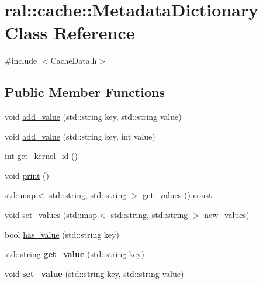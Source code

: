 \hypertarget{classral_1_1cache_1_1MetadataDictionary}{}\section{ral\+:\+:cache\+:\+:Metadata\+Dictionary Class Reference}
\label{classral_1_1cache_1_1MetadataDictionary}


{\ttfamily \#include $<$Cache\+Data.\+h$>$}

\subsection*{Public Member Functions}
\begin{DoxyCompactItemize}
\item 
void \hyperlink{classral_1_1cache_1_1MetadataDictionary_a99828bf2a71b8e06d568420e5c2b460d}{add\+\_\+value} (std\+::string key, std\+::string value)
\item 
void \hyperlink{classral_1_1cache_1_1MetadataDictionary_a5f2f0c2542ea15ca00d273df68041551}{add\+\_\+value} (std\+::string key, int value)
\item 
int \hyperlink{classral_1_1cache_1_1MetadataDictionary_a03066b3e050bf5f504613aab7604d768}{get\+\_\+kernel\+\_\+id} ()
\item 
void \hyperlink{classral_1_1cache_1_1MetadataDictionary_a762943ae80571c2f5ea6dfbcea07a3bb}{print} ()
\item 
std\+::map$<$ std\+::string, std\+::string $>$ \hyperlink{classral_1_1cache_1_1MetadataDictionary_abdc2863d96dc839565f2078471f4c9f7}{get\+\_\+values} () const
\item 
void \hyperlink{classral_1_1cache_1_1MetadataDictionary_a99d66a4b93ebb5f187da5c8968054a54}{set\+\_\+values} (std\+::map$<$ std\+::string, std\+::string $>$ new\+\_\+values)
\item 
bool \hyperlink{classral_1_1cache_1_1MetadataDictionary_a72ac4462583a2be4be3de19eb230b624}{has\+\_\+value} (std\+::string key)
\item 
\mbox{\label{classral_1_1cache_1_1MetadataDictionary_a50be7e17be586f17dd10228227a51a15}} 
std\+::string {\bfseries get\+\_\+value} (std\+::string key)
\item 
\mbox{\label{classral_1_1cache_1_1MetadataDictionary_afd9178b77c468cc390786830aba8b968}} 
void {\bfseries set\+\_\+value} (std\+::string key, std\+::string value)
\end{DoxyCompactItemize}


